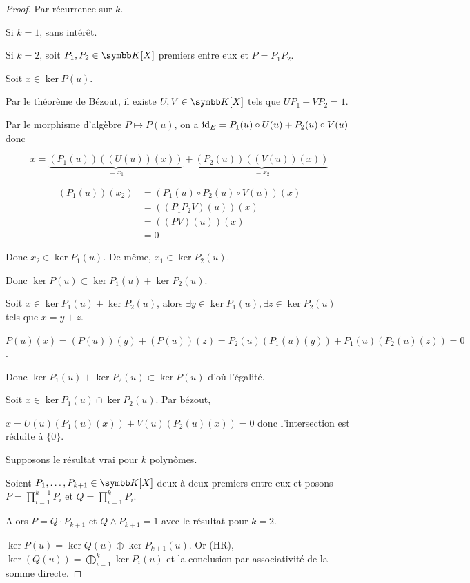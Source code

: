
\begin{proof}
    Par récurrence sur $k$. 

    Si $k = 1$, sans intérêt. 

    Si $k = 2$, soit $P_1, P_2 \in \K[X]$ premiers entre eux et $P = P_1 P_2$.

    Soit $x \in \ker P(u)$. 

    Par le théorème de Bézout, il existe $U, V \in \K[X]$ tels que $U P_1 + V P_2 = 1$.

    Par le morphisme d'algèbre $P \mapsto P(u)$, on a 
    $\operatorname{id}_E = P_1(u) \circ U(u) + P_2(u) \circ V(u)$ donc 

    $$x = \underbrace{(P_1(u))((U(u))(x))}_{= x_1} + \underbrace{(P_2(u))((V(u))(x))}_{= x_2}$$

    \begin{align}
        (P_1(u))(x_2) & = (P_1(u) \circ P_2(u) \circ V(u))(x) \\
        & = ((P_1 P_2V)(u))(x) \\
        & = ((PV)(u))(x) \\
        & = 0
    \end{align}

    Donc $x_2 \in \ker P_1(u)$. De même, $x_1 \in \ker P_2(u)$.

    Donc $\ker P(u) \subset \ker P_1(u) + \ker P_2(u)$.


    \lvspace Soit $x \in \ker P_1(u) + \ker P_2(u)$, alors $\exists y \in \ker P_1 (u), 
    \exists z \in \ker P_2(u)$ tels que $x = y + z$.

    $P(u)(x) = (P(u))(y) + (P(u))(z) = P_2(u)(P_1(u)(y)) + P_1(u)(P_2(u)(z)) = 0$. 

    Donc $\ker P_1 (u) + \ker P_2(u) \subset \ker P(u)$ d'où l'égalité. 

    Soit $x \in \ker P_1(u) \cap \ker P_2(u)$. Par bézout, 

    $x = U(u)(P_1(u)(x)) + V(u)(P_2(u)(x)) = 0$ donc l'intersection est réduite à $\{0\}$.

     Supposons le résultat vrai pour $k$ polynômes. 

    Soient $P_1, \dots, P_{k + 1} \in \K[X]$ deux à deux premiers entre eux et posons 
    $P = \displaystyle \prod_{i = 1}^{ k + 1 } P_i$ et $Q = \displaystyle \prod_{i = 1 }^{ k } P_i$.

    Alors $P = Q \cdot P_{k + 1}$ et $Q \wedge P_{k + 1} = 1$ avec le résultat pour $k = 2$.

    $\ker P(u) = \ker Q(u) \oplus \ker P_{k + 1}(u)$. Or (HR), 
    $\ker(Q(u)) = \bigoplus_{i = 1 }^{ k } \ker P_i(u)$ et la conclusion par associativité de 
    la somme directe.
\end{proof}


